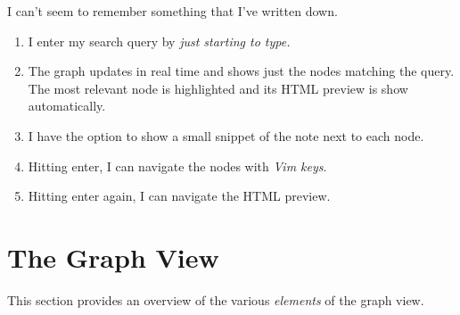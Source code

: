\documentclass{article}
\begin{document}
I can't seem to remember something that I've written down.

\begin{enumerate}
	\item I enter my search query by \emph{just starting to type.}

	\item The graph updates in real time and shows just the nodes matching the query. The most relevant node is highlighted and its HTML preview is show automatically.

	\item I have the option to show a small snippet of the note next to each node.

	\item Hitting enter, I can navigate the nodes with \emph{Vim keys}.

	\item Hitting enter again, I can navigate the HTML preview.
\end{enumerate}

\newpage

\section{The Graph View}\label{sec:graph_view}

This section provides an overview of the various \emph{elements} of the graph view. 
\end{document}
